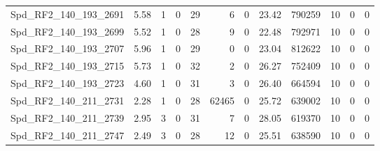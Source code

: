 \begin{longtable}[c]{@{}lrrrrrrrrrrr@{}}
Spd\_RF2\_140\_193\_2691      & 5.58                   & 1                       & 0                       & 29                     & 6                       & 0                       & 23.42                   & 790259                   & 10                       & 0                        & 0                        \\
Spd\_RF2\_140\_193\_2699      & 5.52                   & 1                       & 0                       & 28                     & 9                       & 0                       & 22.48                   & 792971                   & 10                       & 0                        & 0                        \\
Spd\_RF2\_140\_193\_2707      & 5.96                   & 1                       & 0                       & 29                     & 0                       & 0                       & 23.04                   & 812622                   & 10                       & 0                        & 0                        \\
Spd\_RF2\_140\_193\_2715      & 5.73                   & 1                       & 0                       & 32                     & 2                       & 0                       & 26.27                   & 752409                   & 10                       & 0                        & 0                        \\
Spd\_RF2\_140\_193\_2723      & 4.60                   & 1                       & 0                       & 31                     & 3                       & 0                       & 26.40                   & 664594                   & 10                       & 0                        & 0                        \\
Spd\_RF2\_140\_211\_2731      & 2.28                   & 1                       & 0                       & 28                     & 62465                   & 0                       & 25.72                   & 639002                   & 10                       & 0                        & 0                        \\
Spd\_RF2\_140\_211\_2739      & 2.95                   & 3                       & 0                       & 31                     & 7                       & 0                       & 28.05                   & 619370                   & 10                       & 0                        & 0                        \\
Spd\_RF2\_140\_211\_2747      & 2.49                   & 3                       & 0                       & 28                     & 12                      & 0                       & 25.51                   & 638590                   & 10                       & 0                        & 0                        \\

\end{longtable}
